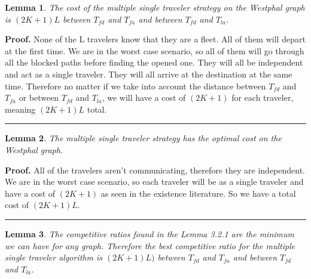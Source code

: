 \documentclass[letter-size, 11pt]{article}
\newtheorem{lemma}{Lemma}
\newenvironment{proof}[1][Proof]{\textbf{#1.} }{\ \rule{0.5em}{0.5em}}
\begin{document}
\begin{lemma} The cost of the multiple single traveler strategy on the Westphal graph is $(2K+1)L$ between $T_{fd}$ and $T_{fa}$ and between $T_{fd}$ and $T_{la}$.
\end{lemma}

\begin{proof} None of the L travelers know that they are a fleet. All of them will depart at the first time. We are in the worst case scenario, so all of them will go through all the blocked paths before finding the opened one. They will all be independent and act as a single traveler. They will all arrive at the destination at the same time. Therefore no matter if we take into account the distance between $T_{fd}$ and $T_{fa}$ or between $T_{fd}$ and $T_{la}$, we will have a cost of $(2K+1)$ for each traveler, meaning $(2K+1)L$ total.
\end{proof}

\begin{lemma}The multiple single traveler strategy has the optimal cost on the Westphal graph.
\end{lemma}

\begin{proof} All of the travelers aren't communicating, therefore they are independent. We are in the worst case scenario, so each traveler will be as a single traveler and have a cost of $(2K+1)$ as seen in the existence literature. So we have a total cost of $(2K+1)L$.
\end{proof}

\begin {lemma} The competitive ratios found in the Lemma 3.2.1 are the minimum we can have for any graph. Therefore the best competitive ratio for the multiple single traveler algorithm is $(2K+1)L)$ between $T_{fd}$ and $T_{fa}$ and between $T_{fd}$ and $T_{la}$.
\end{lemma}
\end{document}
